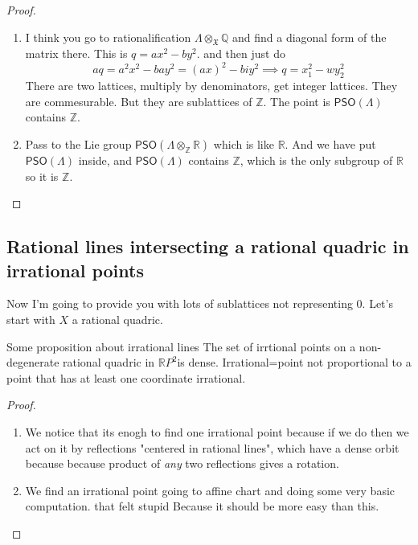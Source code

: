 \begin{proof}\leavevmode
	\begin{enumerate}[label=\textbf{Step \arabic*}]
		\item I think you go to rationalification $\Lambda\otimes_\mathfrak{X} \mathbb{Q}$ and find a diagonal form of the matrix there. This is $q=ax^2-by^2$. and then just do
			\[aq=a^2x^2-bay^2=(ax)^2-biy^2\implies q=x_1^2-wy_2^2\]
There are two lattices, multiply by denominators, get integer lattices. They are commesurable. But they are sublattices of $\mathbb{Z}$. The point is $\mathsf{PSO}(\Lambda)$ contains $ \mathbb{Z}$.
\item Pass to the Lie group $\mathsf{PSO}(\Lambda\otimes_\mathbb{Z}\mathbb{R})$ which is like $\mathbb{R}$. And we have put $\mathsf{PSO}(\Lambda)$ inside, and $\mathsf{PSO}(\Lambda)$ contains $\mathbb{Z}$, which is the only subgroup of  $\mathbb{R}$ so it is $\mathbb{Z}$.
	\end{enumerate}
\end{proof}

\subsection{Rational lines intersecting a rational quadric in irrational points}

Now I'm going to provide you with lots of sublattices not representing 0. Let's start with $X$ a rational quadric.

\begin{thing4}{Some proposition about irrational lines}\leavevmode
	The set of irrtional points on a non-degenerate rational quadric in $\mathbb{R}P^{2}$is dense. Irrational=point not proportional to a point that has at least one coordinate irrational.
\end{thing4}

\begin{proof}\leavevmode
	\begin{enumerate}[label=\textbf{Step \arabic*}]
		\item We notice that its enogh to find one irrational point because if we do then we act on it by reflections "centered in rational lines", which have a dense orbit because because product of \textit{any } two reflections gives a rotation.

		\item We find an irrational point going to affine chart and doing some very basic computation. that felt stupid Because it should be more easy than this.
	\end{enumerate}
\end{proof}

